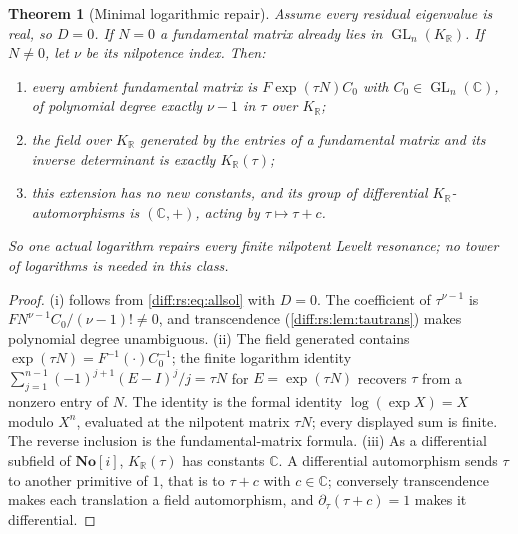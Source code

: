 \documentclass[11pt,letterpaper]{article}
\numberwithin{equation}{section}
\newtheorem{theorem}{Theorem}[section]
\theoremstyle{definition}
\theoremstyle{remark}
\newcommand{\SC}{\mathbf{No}[i]}
\newcommand{\R}{\mathbb R}
\newcommand{\C}{\mathbb C}
\newcommand{\der}{\partial}
\newcommand{\GL}{\operatorname{GL}}
\newcommand{\gm}{\mathbf G_{\mathrm m}}
\newcommand{\derT}{\der_{\tau}}
\newcommand{\KR}{K_{\R}}
\begin{document}
\begin{theorem}[Minimal logarithmic repair]
\label{diff:rs:thm:minlog}
Assume every residual eigenvalue is real, so $D=0$. If $N=0$ a fundamental
matrix already lies in $\GL_{n}(\KR)$. If $N\neq0$, let $\nu$ be its nilpotence
index. Then:
\begin{enumerate}[label=\textup{(\roman*)},leftmargin=2.4em]
\item every ambient fundamental matrix is $F\exp(\tau N)C_{0}$ with
$C_{0}\in\GL_{n}(\C)$, of polynomial degree exactly $\nu-1$ in $\tau$ over
$\KR$;
\item the field over $\KR$ generated by the entries of a fundamental matrix and
its inverse determinant is exactly $\KR(\tau)$;
\item this extension has no new constants, and its group of differential
$\KR$-automorphisms is $(\C,+)$, acting by $\tau\mapsto\tau+c$.
\end{enumerate}
So one actual logarithm repairs every finite nilpotent Levelt resonance; no
tower of logarithms is needed in this class.
\end{theorem}
\begin{proof}
(i) follows from \cref{diff:rs:eq:allsol} with $D=0$. The coefficient of
$\tau^{\nu-1}$ is $FN^{\nu-1}C_{0}/(\nu-1)!\neq0$, and transcendence
(\cref{diff:rs:lem:tautrans}) makes polynomial degree unambiguous. (ii) The
field generated contains $\exp(\tau N)=F^{-1}(\cdot)C_{0}^{-1}$; the finite
logarithm identity $\sum_{j=1}^{n-1}(-1)^{j+1}(E-I)^{j}/j=\tau N$ for
$E=\exp(\tau N)$ recovers $\tau$ from a nonzero entry of $N$.
The identity is the formal identity $\log(\exp X)=X$ modulo $X^n$,
evaluated at the nilpotent matrix $\tau N$; every displayed sum is
finite. The reverse inclusion is the fundamental-matrix formula. (iii) As a differential subfield of
$\SC$, $\KR(\tau)$ has constants $\C$. A differential automorphism sends $\tau$
to another primitive of $1$, that is to $\tau+c$ with $c\in\C$; conversely
transcendence makes each translation a field automorphism, and
$\derT(\tau+c)=1$ makes it differential.
\end{proof}

\end{document}
